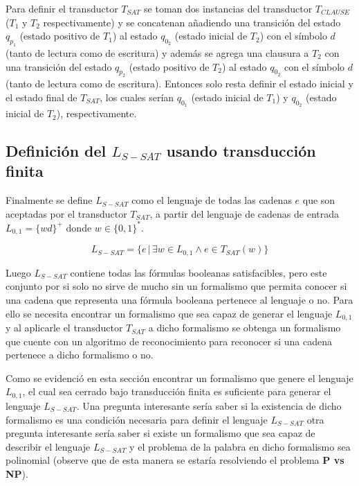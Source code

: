 \documentclass[12pt]{article}
\begin{document}
Para definir el transductor $T_{SAT}$ se toman dos instancias del transductor $T_{CLAUSE}$ ($T_1$ y $T_2$ respectivamente) 
y se concatenan añadiendo una transición del estado $q_{p_1}$ (estado positivo de $T_1$) al estado $q_{0_2}$
(estado inicial de $T_2$) con el símbolo $d$ (tanto de lectura como de escritura) y además se agrega una clausura a $T_2$ con una transición del estado $q_{p_2}$ (estado positivo de $T_2$) al estado $q_{0_2}$ con el símbolo $d$ (tanto de lectura como de escritura). Entonces solo resta definir el estado inicial y el estado final de $T_{SAT}$, los cuales serían $q_{0_1}$ (estado inicial de $T_1$) y $q_{0_2}$ (estado inicial de $T_2$), respectivamente.


\subsection{Definición del $L_{S-SAT}$ usando transducción finita}

Finalmente se define $L_{S-SAT}$ como el lenguaje de todas las cadenas $e$ que son aceptadas por el transductor $T_{SAT}$, a partir del lenguaje
de cadenas de entrada $L_{0,1}=\{wd\}^+$ donde $w\in \{0,1\}^*$. 

$$L_{S-SAT} = \{e\,|\,\exists w \in L_{0,1} \wedge e \in T_{SAT}(w) \}$$

Luego $L_{S-SAT}$ contiene todas las fórmulas booleanas satisfacibles, pero este conjunto por si solo no sirve de mucho sin 
un formalismo que permita conocer si una cadena que representa una fórmula booleana pertenece al lenguaje o 
no. Para ello se necesita encontrar un formalismo que sea capaz de generar el lenguaje $L_{0,1}$ y al aplicarle el transductor 
$T_{SAT}$ a dicho formalismo se obtenga un formalismo que cuente con un algoritmo de reconocimiento para reconocer 
si una cadena pertenece a dicho formalismo o no.

Como se evidenció en esta sección encontrar un formalismo que genere el lenguaje $L_{0,1}$, el cual sea cerrado bajo transducción finita
es suficiente para generar el lenguaje $L_{S-SAT}$. Una pregunta interesante sería saber si la existencia de dicho formalismo
es una condición necesaria para definir el lenguaje $L_{S-SAT}$ otra pregunta interesante sería saber si existe un formalismo
que sea capaz de describir el lenguaje $L_{S-SAT}$ y el problema de la palabra en dicho formalismo sea polinomial (observe que de esta manera
se estaría resolviendo el problema \textbf{P vs NP}).
\end{document}
